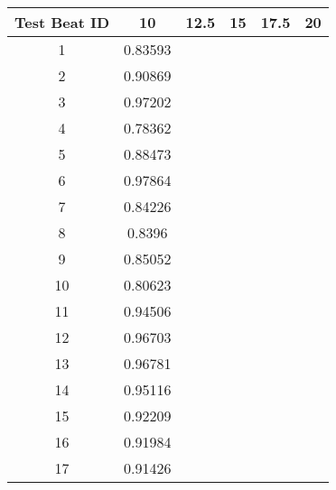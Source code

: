 \begin{tabular}{|c|c|c|c|c|c|}
\hline 
Test Beat ID & 10 & 12.5 & 15 & 17.5 & 20 \\ 
\hline 
1 & 0.83593 &  &  &  &  \\ 
2 & 0.90869 &  &  &  &  \\ 
3 & 0.97202 &  &  &  &  \\ 
4 & 0.78362 &  &  &  &  \\ 
5 & 0.88473 &  &  &  &  \\ 
6 & 0.97864 &  &  &  &  \\ 
7 & 0.84226 &  &  &  &  \\ 
8 & 0.8396 &  &  &  &  \\ 
9 & 0.85052 &  &  &  &  \\ 
10 & 0.80623 &  &  &  &  \\ 
11 & 0.94506 &  &  &  &  \\ 
12 & 0.96703 &  &  &  &  \\ 
13 & 0.96781 &  &  &  &  \\ 
14 & 0.95116 &  &  &  &  \\ 
15 & 0.92209 &  &  &  &  \\ 
16 & 0.91984 &  &  &  &  \\ 
17 & 0.91426 &  &  &  &  \\ 
\hline 
\end{tabular}